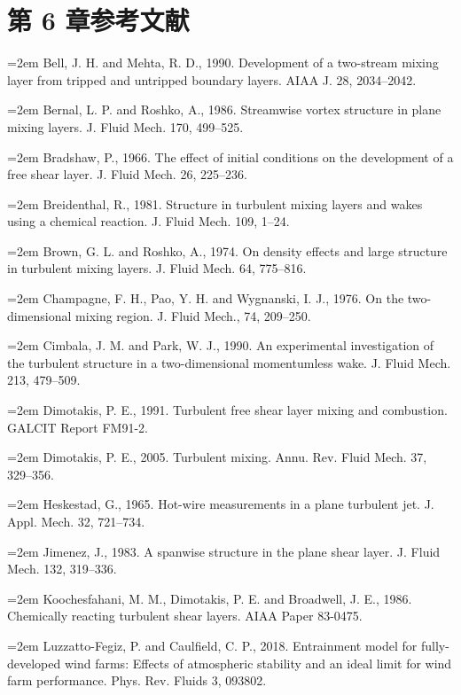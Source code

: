 \documentclass[12pt,a4paper,openany,fontset=none]{ctexbook}
\begin{document}
\section*{第 6 章参考文献}
\par\hangindent=2em Bell, J. H. and Mehta, R. D., 1990. Development of a two-stream mixing layer from tripped and untripped boundary layers. AIAA J. 28, 2034–2042.
\par\hangindent=2em Bernal, L. P. and Roshko, A., 1986. Streamwise vortex structure in plane mixing layers. J. Fluid Mech. 170, 499–525.
\par\hangindent=2em Bradshaw, P., 1966. The effect of initial conditions on the development of a free shear layer. J. Fluid Mech. 26, 225–236.
\par\hangindent=2em Breidenthal, R., 1981. Structure in turbulent mixing layers and wakes using a chemical reaction. J. Fluid Mech. 109, 1–24.
\par\hangindent=2em Brown, G. L. and Roshko, A., 1974. On density effects and large structure in turbulent mixing layers. J. Fluid Mech. 64, 775–816.
\par\hangindent=2em Champagne, F. H., Pao, Y. H. and Wygnanski, I. J., 1976. On the two-dimensional mixing region. J. Fluid Mech., 74, 209–250.
\par\hangindent=2em Cimbala, J. M. and Park, W. J., 1990. An experimental investigation of the turbulent structure in a two-dimensional momentumless wake. J. Fluid Mech. 213, 479–509.
\par\hangindent=2em Dimotakis, P. E., 1991. Turbulent free shear layer mixing and combustion. GALCIT Report FM91-2.
\par\hangindent=2em Dimotakis, P. E., 2005. Turbulent mixing. Annu. Rev. Fluid Mech. 37, 329–356.
\par\hangindent=2em Heskestad, G., 1965. Hot-wire measurements in a plane turbulent jet. J. Appl. Mech. 32, 721–734.
\par\hangindent=2em Jimenez, J., 1983. A spanwise structure in the plane shear layer. J. Fluid Mech. 132, 319–336.
\par\hangindent=2em Koochesfahani, M. M., Dimotakis, P. E. and Broadwell, J. E., 1986. Chemically reacting turbulent shear layers. AIAA Paper 83-0475.
\par\hangindent=2em Luzzatto-Fegiz, P. and Caulfield, C. P., 2018. Entrainment model for fully-developed wind farms: Effects of atmospheric stability and an ideal limit for wind farm performance. Phys. Rev. Fluids 3, 093802.
\end{document}
